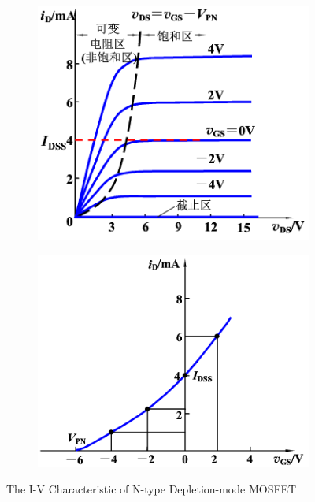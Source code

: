 \begin{figure}[H]
  \centering
  \begin{subfigure}{.5\textwidth}
    \centering
    \includegraphics[width=\linewidth]{figures/DNMOSIV1}
    \label{fig:}
  \end{subfigure}%
  \begin{subfigure}{.5\textwidth}
    \centering
    \includegraphics[width=\linewidth]{figures/DNMOSIV2}
    \label{fig:}
  \end{subfigure}
  \caption{The I-V Characteristic of N-type Depletion-mode MOSFET}
  \label{fig:}
\end{figure}

